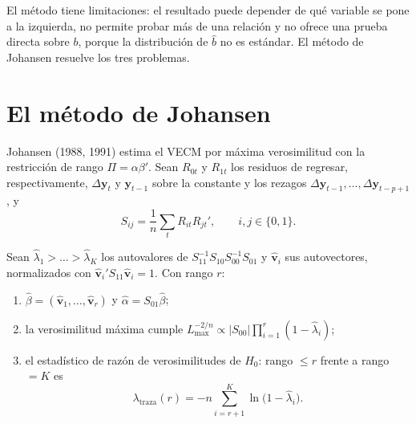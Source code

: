 El método tiene limitaciones: el resultado puede depender de qué variable se pone a la izquierda, no permite
probar más de una relación y no ofrece una prueba directa sobre $b$, porque la distribución de $\hat b$ no es
estándar. El método de Johansen resuelve los tres problemas.

\section{El método de Johansen}

Johansen (1988, 1991) estima el VECM por máxima verosimilitud con la restricción de rango
$\Pi=\alpha\beta'$. Sean $R_{0t}$ y $R_{1t}$ los residuos de regresar, respectivamente, $\Delta\mathbf y_t$ y
$\mathbf y_{t-1}$ sobre la constante y los rezagos $\Delta\mathbf y_{t-1},\dots,\Delta\mathbf y_{t-p+1}$, y
\[
  S_{ij}=\frac1n\sum_{t}R_{it}R_{jt}',\qquad i,j\in\{0,1\}.
\]

\begin{proposicion}\label{prop:johansen}
Sean $\hat\lambda_1>\dots>\hat\lambda_K$ los autovalores de $S_{11}^{-1}S_{10}S_{00}^{-1}S_{01}$ y
$\hat{\mathbf v}_i$ sus autovectores, normalizados con $\hat{\mathbf v}_i'S_{11}\hat{\mathbf v}_i=1$. Con rango $r$:
\begin{enumerate}[label=(\roman*)]
  \item $\hat\beta=(\hat{\mathbf v}_1,\dots,\hat{\mathbf v}_r)$ y $\hat\alpha=S_{01}\hat\beta$;
  \item la verosimilitud máxima cumple $L_{\max}^{-2/n}\propto|S_{00}|\prod_{i=1}^{r}(1-\hat\lambda_i)$;
  \item el estadístico de razón de verosimilitudes de $H_0$: rango $\le r$ frente a rango $=K$ es
        \[
          \lambda_{\text{traza}}(r)=-n\sum_{i=r+1}^{K}\ln\bigl(1-\hat\lambda_i\bigr).
        \]
\end{enumerate}
\end{proposicion}


